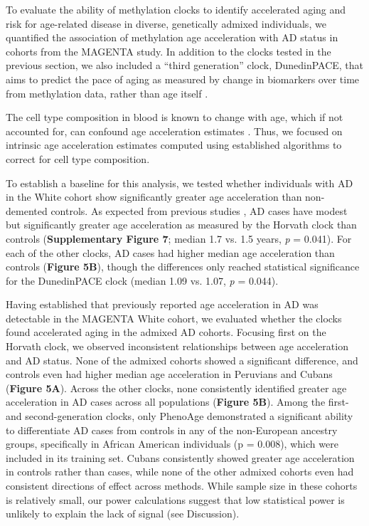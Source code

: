 To evaluate the ability of methylation clocks to identify accelerated aging and risk for age-related disease in diverse, genetically admixed individuals, we quantified the association of methylation age acceleration with AD status in cohorts from the MAGENTA study. In addition to the clocks tested in the previous section, we also included a ``third generation'' clock, DunedinPACE, that aims to predict the pace of aging as measured by change in biomarkers over time from methylation data, rather than age itself \citep{belsky_dunedinpace_2022}. 

The cell type composition in blood is known to change with age, which if not accounted for, can confound age acceleration estimates \citep{jaiswal_clonal_2019}. Thus, we focused on intrinsic age acceleration estimates computed using established algorithms to correct for cell type composition. 

To establish a baseline for this analysis, we tested whether individuals with AD in the White cohort show significantly greater age acceleration than non-demented controls. As expected from previous studies \citep{levine_epigenetic_2015, levine_epigenetic_2018}, AD cases have modest but significantly greater age acceleration as measured by the Horvath clock than controls (\textbf{Supplementary Figure 7}; median 1.7 vs. 1.5 years, \textit{p} = 0.041). For each of the other clocks, AD cases had higher median age acceleration than controls (\textbf{Figure 5B}), though the differences only reached statistical significance for the DunedinPACE clock (median 1.09 vs. 1.07, \textit{p} = 0.044).

Having established that previously reported age acceleration in AD was detectable in the MAGENTA White cohort, we evaluated whether the clocks found accelerated aging in the admixed AD cohorts. Focusing first on the Horvath clock, we observed inconsistent relationships between age acceleration and AD status. None of the admixed cohorts showed a significant difference, and controls even had higher median age acceleration in Peruvians and Cubans  (\textbf{Figure 5A}). Across the other clocks, none consistently identified greater age acceleration in AD cases across all populations (\textbf{Figure 5B}). Among the first- and second-generation clocks, only PhenoAge demonstrated a significant ability to differentiate AD cases from controls in any of the non-European ancestry groups, specifically in African American individuals (p = 0.008), which were included in its training set. Cubans consistently showed greater age acceleration in controls rather than cases, while none of the other admixed cohorts even had consistent directions of effect across methods. While sample size in these cohorts is relatively small, our power calculations suggest that low statistical power is unlikely to explain the lack of signal (see Discussion).


